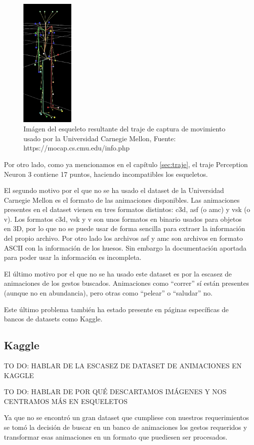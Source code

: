 \begin{figure}[H]
    \centering
    \includegraphics[width=0.23\textwidth]{Imagenes/Bitmap/MCUEsqueleto.jpg}
    \caption{Imágen del esqueleto resultante del traje de captura de movimiento usado por la Universidad Carnegie Mellon, Fuente: https://mocap.cs.cmu.edu/info.php}
    \label{fig:MCUEsqueleto}
\end{figure}

Por otro lado, como ya mencionamos en el capítulo \ref{sec:traje}, el traje Perception Neuron 3 contiene 17 puntos, haciendo incompatibles los esqueletos.

El segundo motivo por el que no se ha usado el dataset de la Universidad Carnegie Mellon es el formato de las animaciones disponibles.
Las animaciones presentes en el dataset vienen en tres formatos distintos: c3d, asf (o amc) y vsk (o v).
Los formatos c3d, vsk y v son unos formatos en binario usados para objetos en 3D, por lo que no se puede usar de forma sencilla para extraer la información del propio archivo.
Por otro lado los archivos asf y amc son archivos en formato ASCII con la información de los huesos. Sin embargo la documentación aportada para poder usar la información es incompleta.

El último motivo por el que no se ha usado este dataset es por la escasez de animaciones de los gestos buscados.
Animaciones como ``correr'' sí están presentes (aunque no en abundancia), pero otras como ``pelear'' o ``saludar'' no.

Este último problema también ha estado presente en páginas específicas de bancos de datasets como Kaggle.

\subsection{Kaggle}

TO DO: HABLAR DE LA ESCASEZ DE DATASET DE ANIMACIONES EN KAGGLE

TO DO: HABLAR DE POR QUÉ DESCARTAMOS IMÁGENES Y NOS CENTRAMOS MÁS EN ESQUELETOS

Ya que no se encontró un gran dataset que cumpliese con nuestros requerimientos se tomó la decisión de buscar en un banco de animaciones los gestos requeridos y transformar esas animaciones en un formato que puediesen ser procesados.